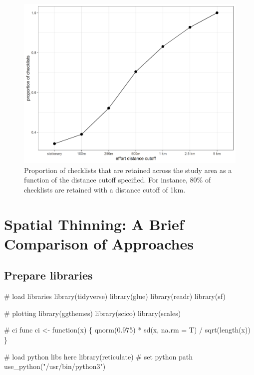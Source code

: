 \documentclass[]{article}
\newenvironment{Shaded}{}{}
\newcommand{\CommentTok}[1]{\textcolor[rgb]{0.00,0.50,0.00}{#1}}
\newcommand{\ControlFlowTok}[1]{\textcolor[rgb]{0.00,0.00,1.00}{#1}}
\newcommand{\DataTypeTok}[1]{#1}
\newcommand{\FloatTok}[1]{#1}
\newcommand{\KeywordTok}[1]{\textcolor[rgb]{0.00,0.00,1.00}{#1}}
\newcommand{\NormalTok}[1]{#1}
\newcommand{\OperatorTok}[1]{#1}
\newcommand{\StringTok}[1]{\textcolor[rgb]{0.00,0.50,0.50}{#1}}
\begin{document}
\begin{figure}
\centering
\includegraphics{figs/fig_cutoff_effort.png}
\caption{Proportion of checklists that are retained across the study area as a function of the distance cutoff specified. For instance, 80\% of checklists are retained with a distance cutoff of 1km.}
\end{figure}

\hypertarget{spatial-thinning-a-brief-comparison-of-approaches}{%
\section{Spatial Thinning: A Brief Comparison of Approaches}\label{spatial-thinning-a-brief-comparison-of-approaches}}

\hypertarget{prepare-libraries-3}{%
\subsection{Prepare libraries}\label{prepare-libraries-3}}

\begin{Shaded}
\begin{Highlighting}[numbers=left,,]
\CommentTok{# load libraries}
\KeywordTok{library}\NormalTok{(tidyverse)}
\KeywordTok{library}\NormalTok{(glue)}
\KeywordTok{library}\NormalTok{(readr)}
\KeywordTok{library}\NormalTok{(sf)}

\CommentTok{# plotting}
\KeywordTok{library}\NormalTok{(ggthemes)}
\KeywordTok{library}\NormalTok{(scico)}
\KeywordTok{library}\NormalTok{(scales)}

\CommentTok{# ci func}
\NormalTok{ci <-}\StringTok{ }\ControlFlowTok{function}\NormalTok{(x) \{}
  \KeywordTok{qnorm}\NormalTok{(}\FloatTok{0.975}\NormalTok{) }\OperatorTok{*}\StringTok{ }\KeywordTok{sd}\NormalTok{(x, }\DataTypeTok{na.rm =}\NormalTok{ T) }\OperatorTok{/}\StringTok{ }\KeywordTok{sqrt}\NormalTok{(}\KeywordTok{length}\NormalTok{(x))}
\NormalTok{\}}

\CommentTok{# load python libs here}
\KeywordTok{library}\NormalTok{(reticulate)}
\CommentTok{# set python path}
\KeywordTok{use_python}\NormalTok{(}\StringTok{"/usr/bin/python3"}\NormalTok{)}
\end{Highlighting}
\end{Shaded}
\end{document}
